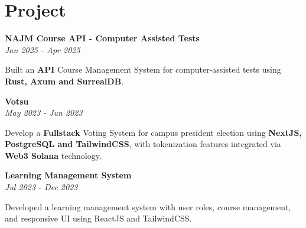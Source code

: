 \section*{Project}

\textbf{NAJM Course API - Computer Assisted Tests} \\
\textit{Jan 2025 - Apr 2025}

\vspace{0.5em}

Built an \textbf{API} Course Management System for computer-assisted tests using \textbf{Rust, Axum and SurrealDB}.

\vspace{1em}

\textbf{Votsu} \\
\textit{May 2023 - Jun 2023}

\vspace{0.5em}

Develop a \textbf{Fullstack} Voting System for campus president election using \textbf{NextJS, PostgreSQL and TailwindCSS}, with tokenization features integrated via \textbf{Web3 Solana} technology.

\vspace{1em}

\textbf{Learning Management System} \\
\textit{Jul 2023 - Dec 2023}

\vspace{0.5em}

Developed a learning management system with user roles, course management, and responsive UI using ReactJS and TailwindCSS.
